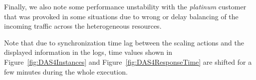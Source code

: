 Finally, we also note some performance unstability with the \emph{platinum} customer that was provoked in some situations due to wrong or delay balancing of the incoming traffic across the heterogeneous resources.

Note that due to synchronization time lag between the scaling actions and the displayed information in the logs, time values shown in Figure~\ref{fig:DAS4Instances} and Figure~\ref{fig:DAS4ResponseTime} are shifted for a few minutes during the whole execution.

